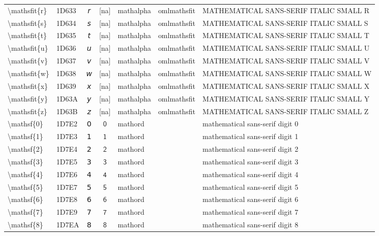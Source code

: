 \documentclass[a4paper,landscape]{article}
\begin{document}
\begin{longtable}{llcclll}
\textbackslash{}mathsfit\{r\} & 1D633 & 𝘳 & [na] & mathalpha & omlmathsfit & MATHEMATICAL SANS-SERIF ITALIC SMALL R \\
\textbackslash{}mathsfit\{s\} & 1D634 & 𝘴 & [na] & mathalpha & omlmathsfit & MATHEMATICAL SANS-SERIF ITALIC SMALL S \\
\textbackslash{}mathsfit\{t\} & 1D635 & 𝘵 & [na] & mathalpha & omlmathsfit & MATHEMATICAL SANS-SERIF ITALIC SMALL T \\
\textbackslash{}mathsfit\{u\} & 1D636 & 𝘶 & [na] & mathalpha & omlmathsfit & MATHEMATICAL SANS-SERIF ITALIC SMALL U \\
\textbackslash{}mathsfit\{v\} & 1D637 & 𝘷 & [na] & mathalpha & omlmathsfit & MATHEMATICAL SANS-SERIF ITALIC SMALL V \\
\textbackslash{}mathsfit\{w\} & 1D638 & 𝘸 & [na] & mathalpha & omlmathsfit & MATHEMATICAL SANS-SERIF ITALIC SMALL W \\
\textbackslash{}mathsfit\{x\} & 1D639 & 𝘹 & [na] & mathalpha & omlmathsfit & MATHEMATICAL SANS-SERIF ITALIC SMALL X \\
\textbackslash{}mathsfit\{y\} & 1D63A & 𝘺 & [na] & mathalpha & omlmathsfit & MATHEMATICAL SANS-SERIF ITALIC SMALL Y \\
\textbackslash{}mathsfit\{z\} & 1D63B & 𝘻 & [na] & mathalpha & omlmathsfit & MATHEMATICAL SANS-SERIF ITALIC SMALL Z \\
\textbackslash{}mathsf\{0\} & 1D7E2 & 𝟢 & $\mathsf{0}$ & mathord &  & mathematical sans-serif digit 0 \\
\textbackslash{}mathsf\{1\} & 1D7E3 & 𝟣 & $\mathsf{1}$ & mathord &  & mathematical sans-serif digit 1 \\
\textbackslash{}mathsf\{2\} & 1D7E4 & 𝟤 & $\mathsf{2}$ & mathord &  & mathematical sans-serif digit 2 \\
\textbackslash{}mathsf\{3\} & 1D7E5 & 𝟥 & $\mathsf{3}$ & mathord &  & mathematical sans-serif digit 3 \\
\textbackslash{}mathsf\{4\} & 1D7E6 & 𝟦 & $\mathsf{4}$ & mathord &  & mathematical sans-serif digit 4 \\
\textbackslash{}mathsf\{5\} & 1D7E7 & 𝟧 & $\mathsf{5}$ & mathord &  & mathematical sans-serif digit 5 \\
\textbackslash{}mathsf\{6\} & 1D7E8 & 𝟨 & $\mathsf{6}$ & mathord &  & mathematical sans-serif digit 6 \\
\textbackslash{}mathsf\{7\} & 1D7E9 & 𝟩 & $\mathsf{7}$ & mathord &  & mathematical sans-serif digit 7 \\
\textbackslash{}mathsf\{8\} & 1D7EA & 𝟪 & $\mathsf{8}$ & mathord &  & mathematical sans-serif digit 8 \\

\end{longtable}
\end{document}
